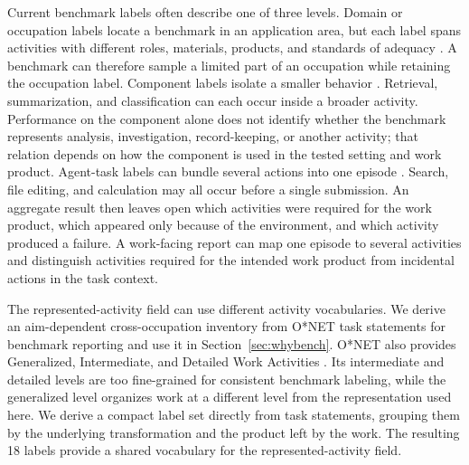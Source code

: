 \documentclass[10pt]{article}
\begin{document}
Current benchmark labels often describe one of three levels. Domain or occupation labels locate a benchmark in an application area, but each label spans activities with different roles, materials, products, and standards of adequacy \citep{handel2016onet,onet2024tasks}. A benchmark can therefore sample a limited part of an occupation while retaining the occupation label. Component labels isolate a smaller behavior \citep{rajpurkar2016squad,nallapati2016cnndm,thakur2021beir}. Retrieval, summarization, and classification can each occur inside a broader activity. Performance on the component alone does not identify whether the benchmark represents analysis, investigation, record-keeping, or another activity; that relation depends on how the component is used in the tested setting and work product. Agent-task labels can bundle several actions into one episode \citep{zhou2023webarena,xie2024osworld,wang2024officebench}. Search, file editing, and calculation may all occur before a single submission. An aggregate result then leaves open which activities were required for the work product, which appeared only because of the environment, and which activity produced a failure. A work-facing report can map one episode to several activities and distinguish activities required for the intended work product from incidental actions in the task context.

The represented-activity field can use different activity vocabularies. We derive an aim-dependent cross-occupation inventory from O{*}NET task statements \citep{onet2024tasks} for benchmark reporting and use it in Section~\ref{sec:whybench}. O{*}NET also provides Generalized, Intermediate, and Detailed Work Activities \citep{onet2026overview}. Its intermediate and detailed levels are too fine-grained for consistent benchmark labeling, while the generalized level organizes work at a different level from the representation used here. We derive a compact label set directly from task statements, grouping them by the underlying transformation and the product left by the work. The resulting 18 labels provide a shared vocabulary for the represented-activity field.
\end{document}
